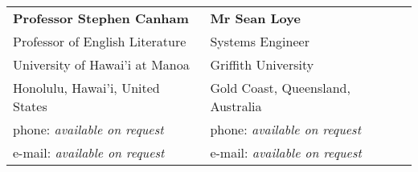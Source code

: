 \documentclass[margin,line]{resume}
\begin{document}
\begin{resume}
\begin{tabular}{@{}p{6cm}p{6cm}}
\textbf{Professor Stephen Canham}       &  \textbf{Mr Sean Loye}                    \\
Professor of English Literature         &  Systems Engineer                         \\
University of Hawai'i at Manoa          &  Griffith University                      \\
Honolulu, Hawai'i, United States        &  Gold Coast, Queensland, Australia        \\
phone: \textsl{available on request}    &  phone: \textsl{available on request}     \\
e-mail: \textsl{available on request}   &  e-mail: \textsl{available on request}    \\
\end{tabular}



\end{resume}
\end{document}
